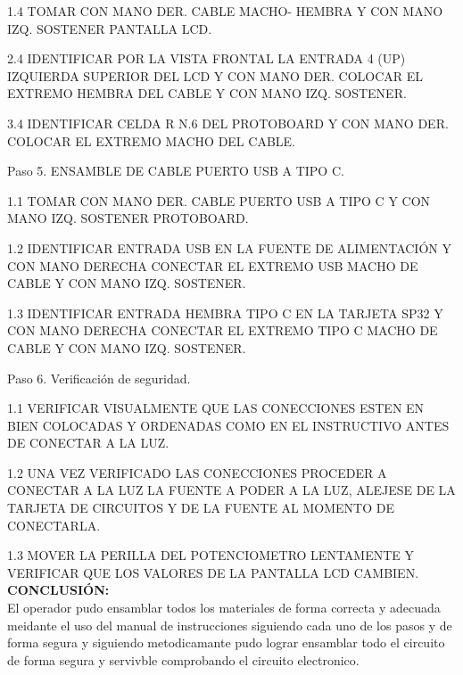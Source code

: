 1.4  TOMAR CON MANO DER. CABLE MACHO- HEMBRA Y CON MANO IZQ. SOSTENER PANTALLA LCD.





2.4  IDENTIFICAR POR LA VISTA FRONTAL LA ENTRADA 4 (UP)  IZQUIERDA SUPERIOR DEL LCD Y CON MANO DER. COLOCAR EL EXTREMO HEMBRA DEL CABLE Y CON MANO IZQ. SOSTENER.





 
3.4 IDENTIFICAR CELDA R N.6 DEL PROTOBOARD Y CON MANO DER. COLOCAR EL EXTREMO MACHO DEL CABLE.












Paso 5. ENSAMBLE DE CABLE PUERTO USB A TIPO C.

1.1	TOMAR CON MANO DER. CABLE PUERTO USB A TIPO C Y CON MANO IZQ. SOSTENER PROTOBOARD.





1.2	IDENTIFICAR ENTRADA USB EN LA FUENTE DE ALIMENTACIÓN Y CON MANO DERECHA CONECTAR EL EXTREMO USB MACHO DE CABLE Y CON MANO IZQ. SOSTENER.





1.3	IDENTIFICAR ENTRADA HEMBRA TIPO C EN LA TARJETA SP32 Y CON MANO DERECHA CONECTAR EL EXTREMO TIPO C MACHO DE CABLE Y CON MANO IZQ. SOSTENER.











Paso 6. Verificación de seguridad.

1.1	VERIFICAR VISUALMENTE QUE LAS CONECCIONES ESTEN EN BIEN COLOCADAS Y ORDENADAS COMO EN EL INSTRUCTIVO ANTES DE CONECTAR A LA LUZ.




1.2	UNA VEZ VERIFICADO LAS CONECCIONES PROCEDER A CONECTAR A LA LUZ LA FUENTE A PODER A LA LUZ, ALEJESE DE LA TARJETA DE CIRCUITOS Y DE LA FUENTE AL MOMENTO DE CONECTARLA.




1.3 MOVER LA PERILLA DEL POTENCIOMETRO LENTAMENTE Y VERIFICAR QUE LOS VALORES DE LA PANTALLA LCD CAMBIEN. \\


\textbf{CONCLUSIÓN:}
\\El operador pudo ensamblar todos los materiales de forma correcta y adecuada meidante el uso del manual de instrucciones siguiendo cada uno de los pasos y de forma segura y siguiendo metodicamante pudo lograr ensamblar todo el circuito de forma segura y servivble comprobando el circuito electronico. 



 
